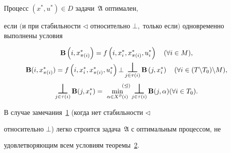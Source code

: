 \hypertarget{ovch:th2}{}



\begin{theorem}[2]Процесс $(x^\ast,u^\ast) \in D$ задачи~\hyperlink{ovch:zadmm}{$\mathfrak{A}$} оптимален$,$

если $($и при стабильности $\triangleleft$ относительно $\bot, $ только если$)$ одновременно выполнены условия

\begin{gather*}

{\bf B}\left(i,x_{\pi (i)}^\ast \right)=f\left(i,x_i^\ast,x_{\pi

(i)}^\ast ,u_i^\ast \right) \quad

(\forall i\in M), \\

{\bf B}(i,x_{\pi (i)}^\ast )=f\left(i,x_i^\ast,x_{\pi (i)}^\ast

,u_i^\ast \right)\bot \mathop{\text{\huge$\perp$}}\limits_{j\in \tau (i)}

{\bf B}\left(j,x_i^\ast \right) \quad

(\forall i\in (T\backslash T_0 )\backslash M),\\

\mathop{\text{\huge$\perp$}}\limits_{j\in \tau (i)} {\bf B}(j,x_i^\ast )= \min

\limits_{\alpha \in X^\partial (i)}^{{\hspace{9mm}}(\trianglelefteq)}

\mathop{\text{\huge$\perp$}}\limits_{j\in \tau (i)} {\bf B}(j,\alpha) (\forall i\in

T_0 ).

\end{gather*}

\end{theorem}



\smallskip



\begin{remark}[5] В случае замечания~\hyperlink{ovch:zam1}{1} (когда нет стабильности $\triangleleft $

относительно $\bot$) легко строится задача~\hyperlink{ovch:zadmm}{$\mathfrak{A}$} с оптимальным процессом, не

удовлетворяющим всем условиям теоремы~\hyperlink{ovch:th2}{2}.

\end{remark}



